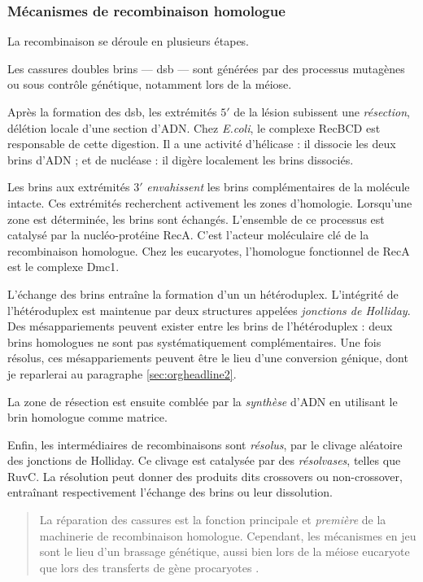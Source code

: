 \documentclass[11pt, oneside]{scrartcl}
\begin{document}
\subsubsection{Mécanismes de recombinaison homologue}
\label{sec:orgheadline3}

La recombinaison se déroule en plusieurs étapes. 

Les cassures doubles brins --- \ac{dsb} --- sont générées par des processus
mutagènes ou sous contrôle génétique, notamment lors de la méiose. 

Après la formation des \ac{dsb}, les extrémités \(5'\) de la lésion subissent une
\emph{résection}, délétion locale d'une section d'ADN. Chez \emph{E.coli}, le complexe
RecBCD est responsable de cette digestion. Il a une activité d'hélicase : il
dissocie les deux brins d'ADN ; et de nucléase : il digère localement les brins
dissociés\cite{dillingham_recbcd_2008}. 

Les brins aux extrémités \(3'\) \emph{envahissent} les brins complémentaires de la
molécule intacte. Ces extrémités recherchent activement les zones d'homologie.
Lorsqu'une zone est déterminée, les brins sont échangés. L'ensemble de ce
processus est catalysé par la nucléo-protéine RecA\cite{chen_mechanism_2008}.
C'est l'acteur moléculaire clé de la recombinaison homologue. Chez les
eucaryotes, l'homologue fonctionnel de RecA est le complexe
Dmc1\cite{bishop_dmc1:_1992}.

L'échange des brins entraîne la formation d'un un hétéroduplex. L'intégrité de
l'hétéroduplex est maintenue par deux structures appelées \emph{jonctions de
Holliday}. Des mésappariements peuvent exister entre les brins de
l'hétéroduplex : deux brins homologues ne sont pas systématiquement
complémentaires. Une fois résolus, ces mésappariements peuvent être le lieu
d'une conversion génique, dont je reparlerai au paragraphe \ref{sec:orgheadline2}.

La zone de résection est ensuite comblée par la \emph{synthèse} d'ADN en utilisant le
brin homologue comme matrice.

Enfin, les intermédiaires de recombinaisons sont \emph{résolus}, par le clivage
aléatoire des jonctions de Holliday. Ce clivage est catalysée par des
\emph{résolvases}, telles que RuvC\cite{gorecka_crystal_2013}. La résolution peut
donner des produits dits crossovers ou non-crossover, entraînant respectivement
l'échange des brins ou leur dissolution\cite{mancera_high-resolution_2008}.

\begin{quote}
La réparation des cassures est la fonction principale et \emph{première} de la
machinerie de recombinaison homologue. Cependant, les mécanismes en jeu sont le
lieu d'un brassage génétique, aussi bien lors de la méiose eucaryote que lors
des transferts de gène procaryotes \cite{redfield_bacteria_2001}.
\end{quote}
\end{document}
